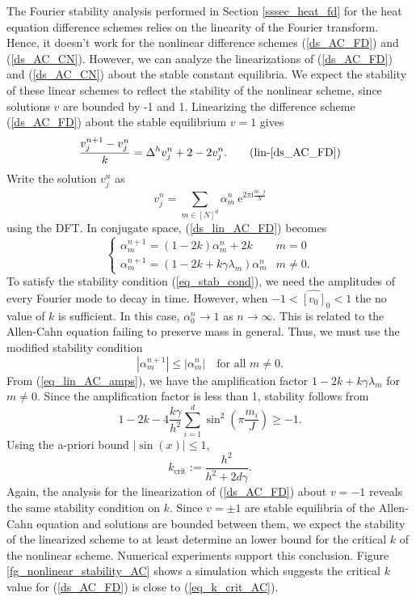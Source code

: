 \documentclass[12pt, reqno]{report}
\theoremstyle{definition}
\theoremstyle{remark}
\newcommand{\e}{\mathrm{e}}
\renewcommand{\i}{\mathrm{i}}
\begin{document}
The Fourier stability analysis performed in Section \ref{sssec_heat_fd} for the heat equation difference schemes relies on the linearity of the Fourier transform. 
Hence, it doesn't work for the nonlinear difference schemes (\ref{ds_AC_FD}) and (\ref{ds_AC_CN}). 
However, we can analyze the linearizations of (\ref{ds_AC_FD}) and (\ref{ds_AC_CN}) about the stable constant equilibria. 
We expect the stability of these linear schemes to reflect the stability of the nonlinear scheme, since solutions $v$ are bounded by -1 and 1. 
Linearizing the difference scheme (\ref{ds_AC_FD}) about the stable equilibrium $v=1$ gives
\begin{equation} \label{ds_lin_AC_FD}
    \frac{v_{j}^{n+1}-v_{j}^{n}}{k}=\Delta^{h}v_{j}^{n}+2-2v_{j}^{n}. \tag{lin-\ref{ds_AC_FD}}
\end{equation}
Write the solution $v_{j}^{n}$ as 
\begin{equation}
    v_{j}^{n}=\sum_{m\in [N]^{d}}\alpha_{m}^{n}~\e^{2\pi\i \frac{m\cdot j}{N}}
\end{equation}
using the DFT. In conjugate space, (\ref{ds_lin_AC_FD}) becomes 
\begin{equation} \label{eq_lin_AC_amps}
    \begin{cases}
        \alpha_{m}^{n+1}= \left(1- 2k\right)\alpha_{m}^{n}+ 2k & m=0\\
        \alpha_{m}^{n+1}= \left(1- 2k+k \gamma \lambda_{m}\right)\alpha_{m}^{n} & m\ne0.
    \end{cases}
\end{equation}
To satisfy the stability condition (\ref{eq_stab_cond}), we need the amplitudes of every Fourier mode to decay in time.
However, when $-1<\widehat{[v_{0}]}_{0}<1$ the no value of $k$ is sufficient.
In this case, $\alpha_{0}^{n}\to 1$ as $n \to \infty$. 
This is related to the Allen-Cahn equation failing to preserve mass in general.
Thus, we must use the modified stability condition
\begin{equation} 
    |\alpha_{m}^{n+1}|\le|\alpha_{m}^{n}|\quad \text{for all }m\ne0.
\end{equation}
From (\ref{eq_lin_AC_amps}), we have the amplification factor $1-2k+k\gamma\lambda_m$ for $m\ne0$.
Since the amplification factor is less than 1, stability follows from
\begin{equation} 
    1- 2k-4 \frac{k \gamma}{h^{2}}\sum_{i=1}^{d}\sin^{2}\left(\pi \frac{m_{i}}{J}\right)\ge-1.
\end{equation}
Using the a-priori bound $|\sin(x)|\le1$, 
\begin{equation} \label{eq_k_crit_AC}
    k_\text{crit}:=\frac{h^{2}}{h^{2}+2d\gamma}.
\end{equation}
Again, the analysis for the linearization of (\ref{ds_AC_FD}) about $v=-1$ reveals the same stability condition on $k$. 
Since $v=\pm1$ are stable equilibria of the Allen-Cahn equation and solutions are bounded between them, we expect the stability of the linearized scheme to at least determine an lower bound for the critical $k$ of the nonlinear scheme. 
Numerical experiments support this conclusion. Figure \ref{fg_nonlinear_stability_AC} shows a simulation which suggests the critical $k$ value for (\ref{ds_AC_FD}) is close to (\ref{eq_k_crit_AC}).
\end{document}
